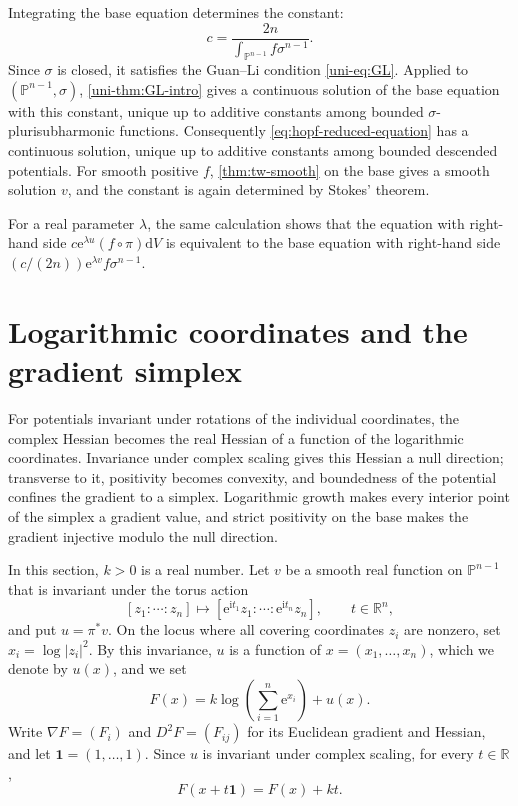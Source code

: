 Integrating the base equation determines the constant:
\[
 c=\frac{2n}{\int_{\mathbb P^{n-1}}f\sigma^{n-1}}.
\]
Since $\sigma$ is closed, it satisfies the Guan--Li condition \eqref{uni-eq:GL}. Applied to $(\mathbb P^{n-1},\sigma)$, \cref{uni-thm:GL-intro} gives a continuous solution of the base equation with this constant, unique up to additive constants among bounded $\sigma$-plurisubharmonic functions. Consequently \eqref{eq:hopf-reduced-equation} has a continuous solution, unique up to additive constants among bounded descended potentials. For smooth positive $f$, \cref{thm:tw-smooth} on the base gives a smooth solution $v$, and the constant is again determined by Stokes' theorem.

For a real parameter $\lambda$, the same calculation shows that the equation with right-hand side $c\mathrm{e}^{\lambda u}(f\circ\pi)\mathrm{d}V$ is equivalent to the base equation with right-hand side $(c/(2n))\mathrm{e}^{\lambda v}f\sigma^{n-1}$.

\section{Logarithmic coordinates and the gradient simplex}

For potentials invariant under rotations of the individual coordinates, the complex Hessian becomes the real Hessian of a function of the logarithmic coordinates. Invariance under complex scaling gives this Hessian a null direction; transverse to it, positivity becomes convexity, and boundedness of the potential confines the gradient to a simplex. Logarithmic growth makes every interior point of the simplex a gradient value, and strict positivity on the base makes the gradient injective modulo the null direction.

In this section, $k>0$ is a real number. Let $v$ be a smooth real function on $\mathbb P^{n-1}$ that is invariant under the torus action
\[
 [z_1:\cdots:z_n]\longmapsto[\mathrm e^{\mathrm it_1}z_1:\cdots:\mathrm e^{\mathrm it_n}z_n],
 \qquad t\in\mathbb R^n,
\]
and put $u=\pi^*v$. On the locus where all covering coordinates $z_i$ are nonzero, set $x_i=\log|z_i|^2$. By this invariance, $u$ is a function of $x=(x_1,\ldots,x_n)$, which we denote by $u(x)$, and we set
\[
 F(x)=k\log\left(\sum_{i=1}^n \mathrm{e}^{x_i}\right)+u(x).
\]
Write $\nabla F=(F_i)$ and $D^2F=(F_{ij})$ for its Euclidean gradient and Hessian, and let $\mathbf1=(1,\ldots,1)$. Since $u$ is invariant under complex scaling, for every $t\in\mathbb R$,
\begin{equation}\label{eq:hopf-convex-translation}
 F(x+t\mathbf1)=F(x)+kt.
\end{equation}

